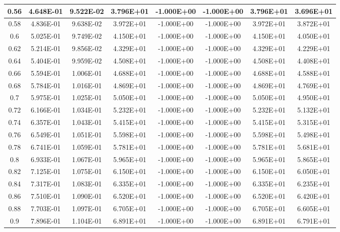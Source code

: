 \documentclass{article}
\begin{document}
\begin{center}
\begin{longtable}{|c|c|c|c|c|c|c|c|}
        0.56 & 4.648E-01 & 9.522E-02 & 3.796E+01 & -1.000E+00 & -1.000E+00 & 3.796E+01 & 3.696E+01 \\ \hline
        0.58 & 4.836E-01 & 9.638E-02 & 3.972E+01 & -1.000E+00 & -1.000E+00 & 3.972E+01 & 3.872E+01 \\ \hline
        0.6 & 5.025E-01 & 9.749E-02 & 4.150E+01 & -1.000E+00 & -1.000E+00 & 4.150E+01 & 4.050E+01 \\ \hline
        0.62 & 5.214E-01 & 9.856E-02 & 4.329E+01 & -1.000E+00 & -1.000E+00 & 4.329E+01 & 4.229E+01 \\ \hline
        0.64 & 5.404E-01 & 9.959E-02 & 4.508E+01 & -1.000E+00 & -1.000E+00 & 4.508E+01 & 4.408E+01 \\ \hline
        0.66 & 5.594E-01 & 1.006E-01 & 4.688E+01 & -1.000E+00 & -1.000E+00 & 4.688E+01 & 4.588E+01 \\ \hline
        0.68 & 5.784E-01 & 1.016E-01 & 4.869E+01 & -1.000E+00 & -1.000E+00 & 4.869E+01 & 4.769E+01 \\ \hline
        0.7 & 5.975E-01 & 1.025E-01 & 5.050E+01 & -1.000E+00 & -1.000E+00 & 5.050E+01 & 4.950E+01 \\ \hline
        0.72 & 6.166E-01 & 1.034E-01 & 5.232E+01 & -1.000E+00 & -1.000E+00 & 5.232E+01 & 5.132E+01 \\ \hline
        0.74 & 6.357E-01 & 1.043E-01 & 5.415E+01 & -1.000E+00 & -1.000E+00 & 5.415E+01 & 5.315E+01 \\ \hline
        0.76 & 6.549E-01 & 1.051E-01 & 5.598E+01 & -1.000E+00 & -1.000E+00 & 5.598E+01 & 5.498E+01 \\ \hline
        0.78 & 6.741E-01 & 1.059E-01 & 5.781E+01 & -1.000E+00 & -1.000E+00 & 5.781E+01 & 5.681E+01 \\ \hline
        0.8 & 6.933E-01 & 1.067E-01 & 5.965E+01 & -1.000E+00 & -1.000E+00 & 5.965E+01 & 5.865E+01 \\ \hline
        0.82 & 7.125E-01 & 1.075E-01 & 6.150E+01 & -1.000E+00 & -1.000E+00 & 6.150E+01 & 6.050E+01 \\ \hline
        0.84 & 7.317E-01 & 1.083E-01 & 6.335E+01 & -1.000E+00 & -1.000E+00 & 6.335E+01 & 6.235E+01 \\ \hline
        0.86 & 7.510E-01 & 1.090E-01 & 6.520E+01 & -1.000E+00 & -1.000E+00 & 6.520E+01 & 6.420E+01 \\ \hline
        0.88 & 7.703E-01 & 1.097E-01 & 6.705E+01 & -1.000E+00 & -1.000E+00 & 6.705E+01 & 6.605E+01 \\ \hline
        0.9 & 7.896E-01 & 1.104E-01 & 6.891E+01 & -1.000E+00 & -1.000E+00 & 6.891E+01 & 6.791E+01 \\ \hline

\end{longtable}
\end{center}
\end{document}
